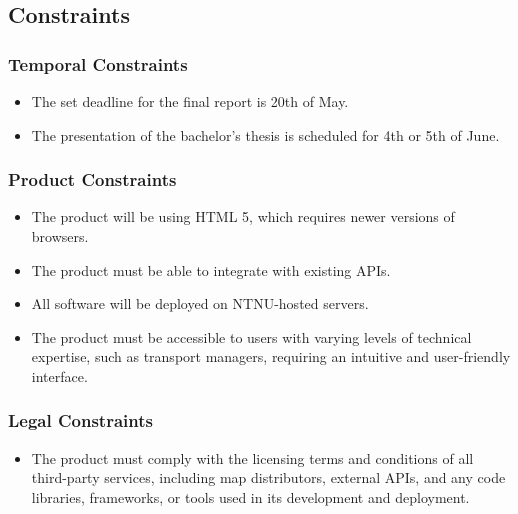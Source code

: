 \subsection{Constraints}
\subsubsection{Temporal Constraints}
\begin{itemize}
    \item The set deadline for the final report is 20th of May.
    \item The presentation of the bachelor's thesis is scheduled for 4th or 5th of June.
\end{itemize}

\subsubsection{Product Constraints}
\begin{itemize}
    \item The product will be using HTML 5, which requires newer versions of browsers.
    \item The product must be able to integrate with existing APIs.
    \item All software will be deployed on NTNU-hosted servers.
    \item The product must be accessible to users with varying levels of technical expertise, such as transport managers, requiring an intuitive and user-friendly interface.
\end{itemize}

\subsubsection{Legal Constraints}
\begin{itemize}
    \item The product must comply with the licensing terms and conditions of all third-party services, including map distributors, external APIs, and any code libraries, frameworks, or tools used in its development and deployment.
\end{itemize}

\newpage
